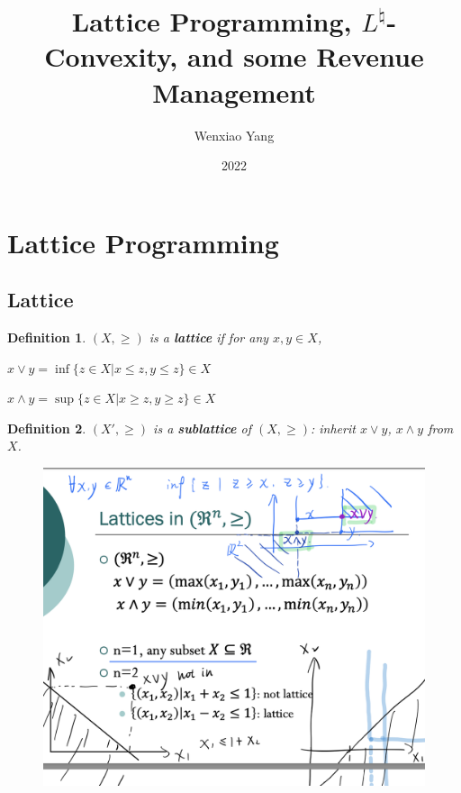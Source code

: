 \documentclass[11pt,a4paper]{article}
\title{Lattice Programming, $L^\natural$-Convexity, and some Revenue Management}
\author[*]{Wenxiao Yang}
\affil[*]{Department of Mathematics, University of Illinois at Urbana-Champaign}
\date{2022}
\newtheorem{definition}{Definition}
\begin{document}
\maketitle
\tableofcontents
\newpage







\section{Lattice Programming}
\subsection{Lattice}
\begin{definition}
    $(X,\geq)$ is a \textbf{lattice} if for any $x,y\in X$,

    \quad $x\vee y=\inf\{z\in X | x\leq z, y\leq z\}\in X$

    \quad $x\wedge y=\sup \{z\in X| x\geq z,y\geq z\}\in X$
\end{definition}

\begin{definition}
    $(X',\geq)$ is a \textbf{sublattice} of $(X,\geq)$: inherit $x\vee y$, $x\wedge y$ from $X$.
\end{definition}

\begin{center}\begin{figure}[htbp]
    \centering
    \includegraphics[scale=0.5]{lattice1.png}
    \caption{}
    \label{}
\end{figure}\end{center}
\end{document}
